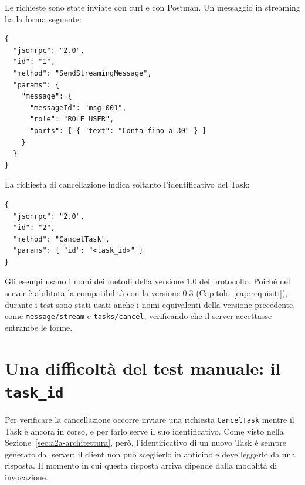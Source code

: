 Le richieste sono state inviate con curl e con Postman. Un messaggio in streaming ha la forma seguente:

\begin{center}
\begin{minipage}{0.95\linewidth}
\footnotesize
\begin{verbatim}
{
  "jsonrpc": "2.0",
  "id": "1",
  "method": "SendStreamingMessage",
  "params": {
    "message": {
      "messageId": "msg-001",
      "role": "ROLE_USER",
      "parts": [ { "text": "Conta fino a 30" } ]
    }
  }
}
\end{verbatim}
\end{minipage}
\end{center}

La richiesta di cancellazione indica soltanto l'identificativo del Task:

\begin{center}
\begin{minipage}{0.95\linewidth}
\footnotesize
\begin{verbatim}
{
  "jsonrpc": "2.0",
  "id": "2",
  "method": "CancelTask",
  "params": { "id": "<task_id>" }
}
\end{verbatim}
\end{minipage}
\end{center}

Gli esempi usano i nomi dei metodi della versione 1.0 del protocollo. Poiché nel server è abilitata la compatibilità con la versione 0.3 (Capitolo~\ref{cap:requisiti}), durante i test sono stati usati anche i nomi equivalenti della versione precedente, come \texttt{message/\allowbreak stream} e \texttt{tasks/\allowbreak cancel}, verificando che il server accettasse entrambe le forme.

\section{Una difficoltà del test manuale: il \texorpdfstring{\texttt{task\_id}}{task\_id}}
\label{sec:difficolta-task-id}

Per verificare la cancellazione occorre inviare una richiesta \texttt{CancelTask} mentre il Task è ancora in corso, e per farlo serve il suo identificativo. Come visto nella Sezione~\ref{sec:a2a-architettura}, però, l'identificativo di un nuovo Task è sempre generato dal server: il client non può sceglierlo in anticipo e deve leggerlo da una risposta. Il momento in cui questa risposta arriva dipende dalla modalità di invocazione.

